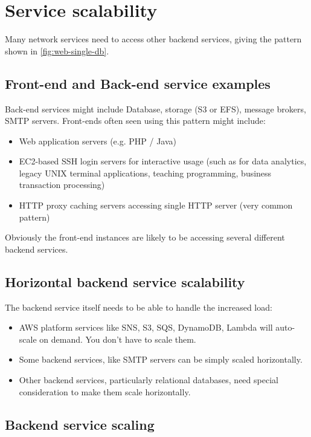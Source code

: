 \documentclass[slides]{pgnotes}
\begin{document}
\newpage
\section{Service scalability}

Many network services need to access other backend services, giving the pattern shown in \autoref{fig:web-single-db}.


\subsection{Front-end and Back-end service examples}

Back-end services might include Database, storage (S3 or EFS), message brokers, SMTP servers. 
Front-ends often seen using this pattern might include: 
\begin{itemize}
\item Web application servers (e.g. PHP / Java)
\item EC2-based SSH login servers for interactive usage (such as for data analytics, legacy UNIX terminal applications, teaching programming, business transaction processing)
\item HTTP proxy caching servers accessing single HTTP server (very common pattern)
\end{itemize}
Obviously the front-end instances are likely to be accessing several different backend services.

\subsection{Horizontal backend service scalability}

The backend service itself needs to be able to handle the increased load:
\begin{itemize}
\item AWS platform services like SNS, S3, SQS, DynamoDB, Lambda will auto-scale on demand.
  You don't have to scale them.
\item Some backend services, like SMTP servers can be simply scaled horizontally.
\item Other backend services, particularly relational databases, need special consideration to make them scale horizontally.
\end{itemize}

\newpage

\subsection{Backend service scaling}
\end{document}
